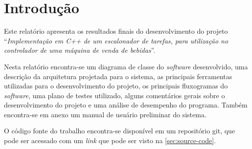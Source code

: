 %
%
%
%
%

%
%
%
%
%

\section{Introdução} \label{sec:introduction}

Este relatório apresenta os resultados finais do desenvolvimento do projeto ``\textit{Implementação em C++ de um escalonador de tarefas, para utilização no controlador de uma máquina de venda de bebidas}''.

Nesta relatório encontra-se um diagrama de classe do \textit{software} desenvolvido, uma descrição da arquitetura projetada para o sistema, as principais ferramentas utilizadas para o desenvolvimento do projeto, os principais fluxogramas do \textit{software}, uma plano de testes utilizado, alguns comentários gerais sobre o desenvolvimento do projeto e uma análise de desempenho do programa. Também encontra-se em anexo um manual de usuário preliminar do sistema.

O código fonte do trabalho encontra-se disponível em um repositório git, que pode ser acessado com um \textit{link} que pode ser visto na \autoref{sec:source-code}.
